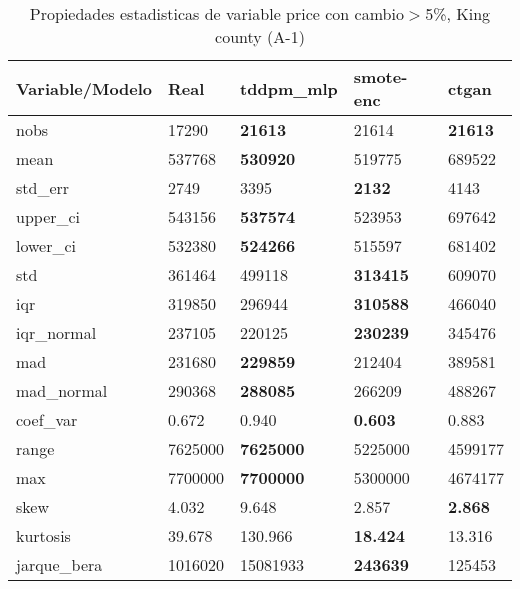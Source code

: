 \begin{table}[H]
\centering
\fontsize{8}{14}\selectfont
\caption{Propiedades estadisticas de variable price con cambio\ensuremath{>}5\%, King county (A-1)}
\label{table-stats-king county-a-1-price-short}
\begin{tabular}{|l|m{10em}|m{10em}|m{10em}|m{10em}|}
\hline
 \rowcolor[gray]{0.8}
Variable/Modelo & Real & tddpm\_mlp & smote-enc & ctgan \\
\hline nobs & 17290 & \bfseries 21613 & \cellcolor[rgb]{0.9, 0.54, 0.52} 21614 & \bfseries 21613 \\
\hline mean & 537768 & \bfseries 530920 & 519775 & \cellcolor[rgb]{0.9, 0.54, 0.52} 689522 \\
\hline std\_err & 2749 & 3395 & \bfseries 2132 & \cellcolor[rgb]{0.9, 0.54, 0.52} 4143 \\
\hline upper\_ci & 543156 & \bfseries 537574 & 523953 & \cellcolor[rgb]{0.9, 0.54, 0.52} 697642 \\
\hline lower\_ci & 532380 & \bfseries 524266 & 515597 & \cellcolor[rgb]{0.9, 0.54, 0.52} 681402 \\
\hline std & 361464 & 499118 & \bfseries 313415 & \cellcolor[rgb]{0.9, 0.54, 0.52} 609070 \\
\hline iqr & 319850 & 296944 & \bfseries 310588 & \cellcolor[rgb]{0.9, 0.54, 0.52} 466040 \\
\hline iqr\_normal & 237105 & 220125 & \bfseries 230239 & \cellcolor[rgb]{0.9, 0.54, 0.52} 345476 \\
\hline mad & 231680 & \bfseries 229859 & 212404 & \cellcolor[rgb]{0.9, 0.54, 0.52} 389581 \\
\hline mad\_normal & 290368 & \bfseries 288085 & 266209 & \cellcolor[rgb]{0.9, 0.54, 0.52} 488267 \\
\hline coef\_var & 0.672 & \cellcolor[rgb]{0.9, 0.54, 0.52} 0.940 & \bfseries 0.603 & 0.883 \\
\hline range & 7625000 & \bfseries 7625000 & 5225000 & \cellcolor[rgb]{0.9, 0.54, 0.52} 4599177 \\
\hline max & 7700000 & \bfseries 7700000 & 5300000 & \cellcolor[rgb]{0.9, 0.54, 0.52} 4674177 \\
\hline skew & 4.032 & \cellcolor[rgb]{0.9, 0.54, 0.52} 9.648 & 2.857 & \bfseries 2.868 \\
\hline kurtosis & 39.678 & \cellcolor[rgb]{0.9, 0.54, 0.52} 130.966 & \bfseries 18.424 & 13.316 \\
\hline jarque\_bera & 1016020 & \cellcolor[rgb]{0.9, 0.54, 0.52} 15081933 & \bfseries 243639 & 125453 \\

\end{tabular}
\end{table}
